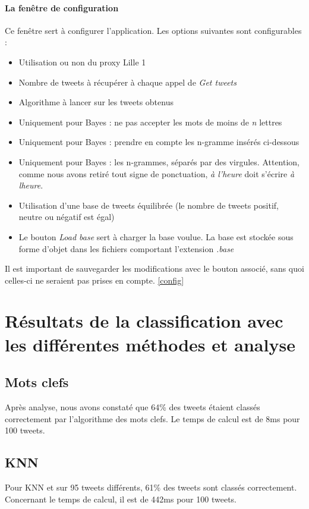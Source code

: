 \documentclass[a4paper,10pt]{report}
\begin{document}
      \subsubsection{La fenêtre de configuration}
	Ce fenêtre sert à configurer l'application. Les options suivantes sont configurables :
	\begin{itemize}
	 \item Utilisation ou non du proxy Lille 1
	 \item Nombre de tweets à récupérer à chaque appel de \textit{Get tweets}
	 \item Algorithme à lancer sur les tweets obtenus
	 \item Uniquement pour Bayes : ne pas accepter les mots de moins de \textit{n} lettres
	 \item Uniquement pour Bayes : prendre en compte les n-gramme insérés ci-dessous
	 \item Uniquement pour Bayes : les n-grammes, séparés par des virgules. Attention, comme nous avons retiré tout signe de ponctuation, \textit{à l'heure} doit s'écrire \textit{à lheure}.
	 \item Utilisation d'une base de tweets équilibrée (le nombre de tweets positif, neutre ou négatif est égal)

	 \item Le bouton \textit{Load base} sert à charger la base voulue. La base est stockée sous forme d'objet dans les fichiers comportant l'extension \textit{.base}
	\end{itemize}
	Il est important de sauvegarder les modifications avec le bouton associé, sans quoi celles-ci ne seraient pas prises en compte.
	\ref{config}
\chapter{Résultats de la classification avec les différentes méthodes et analyse}
    \section{Mots clefs}
      Après analyse, nous avons constaté que 64\% des tweets étaient classés correctement par l'algorithme des mots clefs.
      Le temps de calcul est de 8ms pour 100 tweets. 
    \section{KNN}
      Pour KNN et sur 95 tweets différents, 61\% des tweets sont classés correctement.
      Concernant le temps de calcul, il est de 442ms pour 100 tweets.
\end{document}
